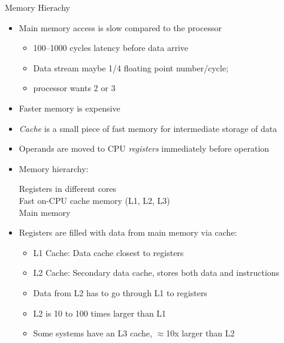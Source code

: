 \begin{frame}[fragile]{Memory Hierachy}
  \begin{itemize}
  \item
    Main memory access is slow compared to the processor
    
    \begin{itemize}
      \tightlist
    \item
      100--1000 cycles latency before data arrive
    \item
      Data stream maybe 1/4 floating point number/cycle;
    \item
      processor wants 2 or 3
    \end{itemize}
  \item
    Faster memory is expensive
  \item
    \emph{Cache} is a small piece of fast memory for intermediate storage
    of data
  \item
    Operands are moved to CPU \emph{registers} immediately before
    operation
  \item Memory hierarchy:
    \begin{center}
      Registers in different cores\\
      Fast on-CPU cache memory (L1, L2, L3)\\
      Main memory
    \end{center}
    
  \item
      Registers are filled with data from main memory via cache:
  \begin{itemize}
    \tightlist
  \item
    L1 Cache: Data cache closest to registers
  \item
    L2 Cache: Secondary data cache, stores both data and instructions
  \item
    Data from L2 has to go through L1 to registers
  \item
    L2 is 10 to 100 times larger than L1
  \item
    Some systems have an L3 cache, $\approx$10x larger than L2
  \end{itemize}

  \end{itemize}  
\end{frame}




